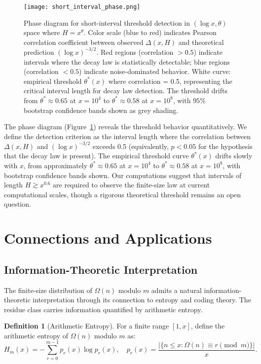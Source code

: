 \documentclass[12pt]{article}
\theoremstyle{definition}
\newtheorem{definition}[theorem]{Definition}
\theoremstyle{remark}
\begin{document}
\begin{figure}[ht]
\centering
\texttt{[image: short\_interval\_phase.png]}
\caption{Phase diagram for short-interval threshold detection in $(\log x, \theta)$ space where $H = x^\theta$. Color scale (blue to red) indicates Pearson correlation coefficient between observed $\Delta(x, H)$ and theoretical prediction $(\log x)^{-3/2}$. Red regions (correlation $> 0.5$) indicate intervals where the decay law is statistically detectable; blue regions (correlation $< 0.5$) indicate noise-dominated behavior. White curve: empirical threshold $\theta^*(x)$ where correlation = 0.5, representing the critical interval length for decay law detection. The threshold drifts from $\theta^* \approx 0.65$ at $x = 10^4$ to $\theta^* \approx 0.58$ at $x = 10^8$, with $95\%$ bootstrap confidence bands shown as grey shading.}
\label{fig:phase}
\end{figure}

The phase diagram (Figure~\ref{fig:phase}) reveals the threshold behavior quantitatively. We define the detection criterion as the interval length where the correlation between $\Delta(x, H)$ and $(\log x)^{-3/2}$ exceeds 0.5 (equivalently, $p < 0.05$ for the hypothesis that the decay law is present). The empirical threshold curve $\theta^*(x)$ drifts slowly with $x$, from approximately $\theta^* \approx 0.65$ at $x = 10^4$ to $\theta^* \approx 0.58$ at $x = 10^8$, with bootstrap confidence bands shown. Our computations suggest that intervals of length $H \gtrsim x^{0.6}$ are required to observe the finite-size law at current computational scales, though a rigorous theoretical threshold remains an open question.

\section{Connections and Applications}

\subsection{Information-Theoretic Interpretation}

The finite-size distribution of $\Omega(n)$ modulo $m$ admits a natural information-theoretic interpretation through its connection to entropy and coding theory. The residue class carries information quantified by arithmetic entropy.

\begin{definition}[Arithmetic Entropy]
For a finite range $[1, x]$, define the arithmetic entropy of $\Omega(n)$ modulo $m$ as:
\[
H_m(x) = -\sum_{r=0}^{m-1} p_r(x) \log p_r(x), \quad p_r(x) = \frac{|\{n \leq x : \Omega(n) \equiv r \pmod{m}\}|}{x}.
\]
\end{definition}
\end{document}
